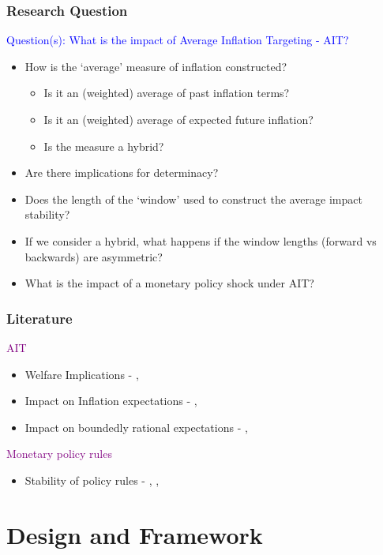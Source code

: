 \documentclass{beamer}
\begin{document}
\begin{frame}
	\frametitle{Research Question}
	\textcolor{blue}{Question(s): What is the impact of Average Inflation Targeting - AIT?}
	\begin{itemize}
		\item How is the `average' measure of inflation constructed?
		\begin{itemize}
			\item Is it an (weighted) average of past inflation terms?
			\item Is it an (weighted) average of expected future inflation?
			\item Is the measure a hybrid?
		\end{itemize}
		\item \setlength\itemsep{1em} Are there implications for determinacy? 
		\item Does the length of the `window' used to construct the average impact stability?
		\item If we consider a hybrid, what happens if the window lengths (forward vs backwards) are asymmetric? 
		\item What is the impact of a monetary policy shock under AIT?
	\end{itemize}
\end{frame}

\begin{frame}
	\frametitle{Literature}
	\textcolor{purple}{AIT}
	\begin{itemize}
		\item Welfare Implications - \cite{budianto2020}, \cite{eo2020}
		\item Impact on Inflation expectations - \cite{coibion2020}, \cite{hoffmann2022}
		\item Impact on boundedly rational expectations - \cite{honka2021}, \cite{budianto2020}
	\end{itemize}
		\textcolor{purple}{Monetary policy rules}
	\begin{itemize}
		\item Stability of policy rules - \cite{nessen2005}, \cite{mertens2019tying}, \cite{svensson2020monetary}
	\end{itemize}
\end{frame}

\section*{Design and Framework}
\end{document}

